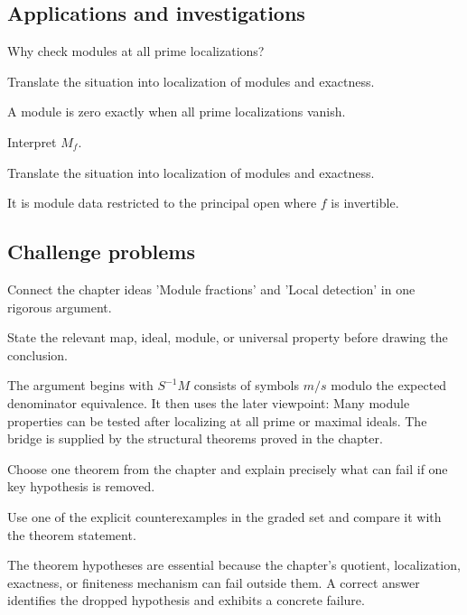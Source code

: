 \subsection*{Applications and investigations}

\begin{exercise}\label{exr:v07-expand-13}
Why check modules at all prime localizations?
\end{exercise}
\begin{hint}
Translate the situation into localization of modules and exactness.
\end{hint}
\begin{solution}
A module is zero exactly when all prime localizations vanish.
\end{solution}

\begin{exercise}[Restriction]\label{exr:v07-expand-14}
Interpret $M_f$.
\end{exercise}
\begin{hint}
Translate the situation into localization of modules and exactness.
\end{hint}
\begin{solution}
It is module data restricted to the principal open where $f$ is invertible.
\end{solution}

\subsection*{Challenge problems}

\begin{exercise}\label{exr:v07-expand-15}
Connect the chapter ideas 'Module fractions' and 'Local detection' in one rigorous argument.
\end{exercise}
\begin{hint}
State the relevant map, ideal, module, or universal property before drawing the conclusion.
\end{hint}
\begin{solution}
The argument begins with $S^{-1}M$ consists of symbols $m/s$ modulo the expected denominator equivalence. It then uses the later viewpoint: Many module properties can be tested after localizing at all prime or maximal ideals. The bridge is supplied by the structural theorems proved in the chapter.
\end{solution}

\begin{exercise}\label{exr:v07-expand-16}
Choose one theorem from the chapter and explain precisely what can fail if one key hypothesis is removed.
\end{exercise}
\begin{hint}
Use one of the explicit counterexamples in the graded set and compare it with the theorem statement.
\end{hint}
\begin{solution}
The theorem hypotheses are essential because the chapter's quotient, localization, exactness, or finiteness mechanism can fail outside them. A correct answer identifies the dropped hypothesis and exhibits a concrete failure.
\end{solution}

